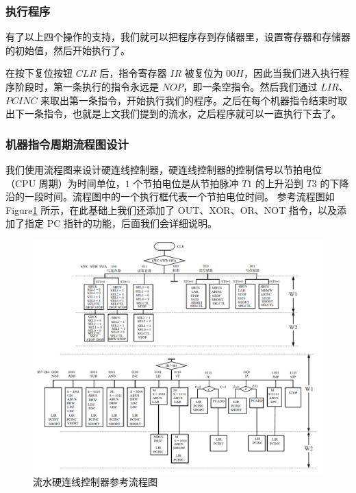 \documentclass[12pt]{article}
\begin{document}
{        \subsubsection{执行程序}
            有了以上四个操作的支持，我们就可以把程序存到存储器里，设置寄存器和存储器的初始值，然后开始执行了。
            
            在按下复位按钮 $CLR$ 后，指令寄存器 $IR$ 被复位为 $00H$，因此当我们进入执行程序阶段时，第一条执行的指令永远是 $NOP$，即一条空指令。然后我们通过 $LIR$、$PCINC$ 来取出第一条指令，开始执行我们的程序。之后在每个机器指令结束时取出下一条指令，也就是上文我们提到的流水，之后程序就可以一直执行下去了。
            
        \subsubsection{机器指令周期流程图设计}
            我们使用流程图来设计硬连线控制器，硬连线控制器的控制信号以节拍电位（CPU 周期）为时间单位，$1$ 个节拍电位是从节拍脉冲 $T1$ 的上升沿到 $T3$ 的下降沿的一段时间。流程图中的一个执行框代表一个节拍电位时间。
            参考流程图如 Figure\ref{fig:5-1-6} 所示，在此基础上我们还添加了 OUT、XOR、OR、NOT 指令，以及添加了指定 PC 指针的功能，后面我们会详细说明。
            \begin{figure}[!ht]
            	\centering
            	\includegraphics[width=1.0\textwidth]{流程图.png}
            	\caption{流水硬连线控制器参考流程图}
            	\centering
            	\label{fig:5-1-6}
            \end{figure}
            
}
\end{document}
